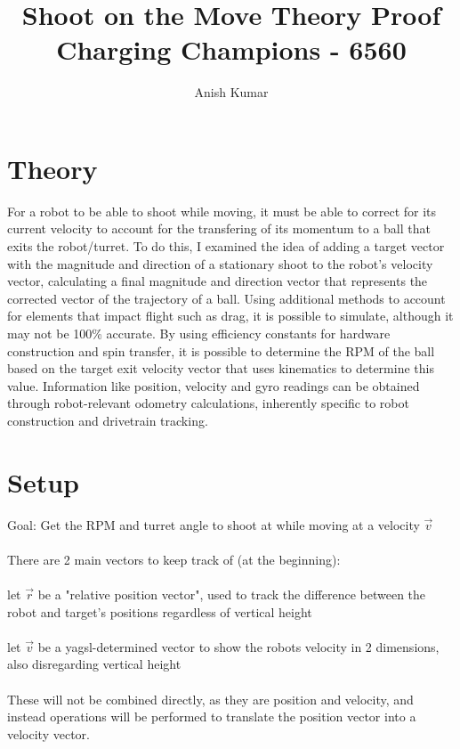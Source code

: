 \documentclass{article}
\title{Shoot on the Move Theory Proof\\
\large Charging Champions - 6560}
\author{Anish Kumar}
\begin{document}
\maketitle

\section{Theory}

For a robot to be able to shoot while moving, it must be able to correct for its current velocity to account for the transfering of its momentum to a ball that exits the robot/turret. To do this, I examined the idea of adding a target vector with the magnitude and direction of a stationary shoot to the robot's velocity vector, calculating a final magnitude and direction vector that represents the corrected vector of the trajectory of a ball. Using additional methods to account for elements that impact flight such as drag, it is possible to simulate, although it may not be 100\% accurate. By using efficiency constants for hardware construction and spin transfer, it is possible to determine the RPM of the ball based on the target exit velocity vector that uses kinematics to determine this value. Information like position, velocity and gyro readings can be obtained through robot-relevant odometry calculations, inherently specific to robot construction and drivetrain tracking.

\section{Setup}

Goal: Get the RPM and turret angle to shoot at while moving at a velocity $\vec{v}$
\\
\\
There are 2 main vectors to keep track of (at the beginning):
\\
\\
let $\vec{r}$ be a "relative position vector", used to track the difference between the robot and target's positions regardless of vertical height 
\\
\\
let $\vec{v}$ be a yagsl-determined vector to show the robots velocity in 2 dimensions, also disregarding vertical height
\\
\\
These will not be combined directly, as they are position and velocity, and instead operations will be performed to translate the position vector into a velocity vector.
\\
\end{document}
